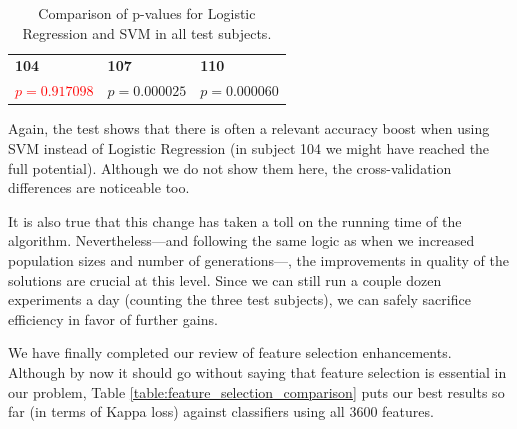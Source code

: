 \newpage

     \begin{table}[h]

        \centering
        \setlength\arrayrulewidth{0.8pt}

        \begin{tabular}{| >{\centering\arraybackslash}m{0.9in} |  >{\centering\arraybackslash}m{0.9in} | >{\centering\arraybackslash}m{0.9in} |}

        	\hline
        	\rowcolor{RoyalBlue}
        	\multicolumn{3}{| >{\centering\arraybackslash}m{3.054in} |}{\textbf{Logistic Regression against SVM}} \\
            \hline
            \rowcolor{RoyalBlue}
            \textbf{104} & \textbf{107} & \textbf{110} \\
            \hline
            \textcolor{red}{$p = 0.917098$} & $p = 0.000025$ & $p = 0.000060$ \\
            \hline

        \end{tabular}

        \caption{Comparison of p-values for Logistic Regression and \acs{SVM} in all test subjects.}\label{table:models_kruskal}

    \end{table}

    Again, the test shows that there is often a relevant accuracy boost when using \acs{SVM} instead of Logistic Regression (in subject 104 we might have reached the full potential). Although we do not show them here, the cross-validation differences are noticeable too.

    It is also true that this change has taken a toll on the running time of the algorithm. Nevertheless---and following the same logic as when we increased population sizes and number of generations---, the improvements in quality of the solutions are crucial at this level. Since we can still run a couple dozen experiments a day (counting the three test subjects), we can safely sacrifice efficiency in favor of further gains.

	We have finally completed our review of feature selection enhancements. Although by now it should go without saying that feature selection is essential in our problem, Table \ref{table:feature_selection_comparison} puts our best results so far (in terms of Kappa loss) against classifiers using all 3600 features.

	\vspace{0.3cm}

